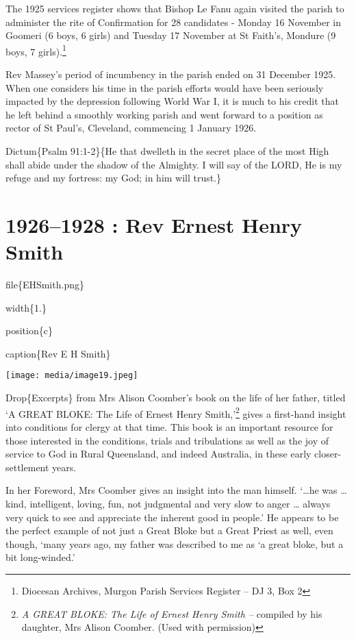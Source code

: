 The 1925 services register shows that Bishop Le Fanu again visited the parish to administer the rite of Confirmation for 28 candidates - Monday 16 November in Goomeri (6 boys, 6 girls) and Tuesday 17 November at St Faith's, Mondure (9 boys, 7 girls).\footnote{Diocesan Archives, Murgon Parish Services Register -- DJ 3, Box 2}

Rev Massey's period of incumbency in the parish ended on 31 December 1925. When one considers his time in the parish efforts would have been seriously impacted by the depression following World War I, it is much to his credit that he left behind a smoothly working parish and went forward to a position as rector of St Paul's, Cleveland, commencing 1 January 1926.

Dictum\{Psalm 91:1-2\}\{He that dwelleth in the secret place of the most High shall abide under the shadow of the Almighty. I will say of the LORD, He is my refuge and my fortress: my God; in him will trust.\}

\hypertarget{rev-ernest-henry-smith}{%
\chapter{1926--1928 : Rev Ernest Henry Smith}\label{rev-ernest-henry-smith}}

file\{EHSmith.png\}

width\{1.\}

position\{c\}

caption\{Rev E H Smith\}

\texttt{[image: media/image19.jpeg]}

Drop\{Excerpts\} from Mrs Alison Coomber's book on the life of her father, titled `A GREAT BLOKE: The Life of Ernest Henry Smith,'\footnote{\emph{A GREAT BLOKE: The Life of Ernest Henry Smith --} compiled by his daughter, Mrs Alison Coomber. (Used with permission)} gives a first-hand insight into conditions for clergy at that time. This book is an important resource for those interested in the conditions, trials and tribulations as well as the joy of service to God in Rural Queensland, and indeed Australia, in these early closer-settlement years.

In her Foreword, Mrs Coomber gives an insight into the man himself. `\ldots he was \ldots{} kind, intelligent, loving, fun, not judgmental and very slow to anger \ldots{} always very quick to see and appreciate the inherent good in people.' He appears to be the perfect example of not just a Great Bloke but a Great Priest as well, even though, `many years ago, my father was described to me as `a great bloke, but a bit long-winded.'

